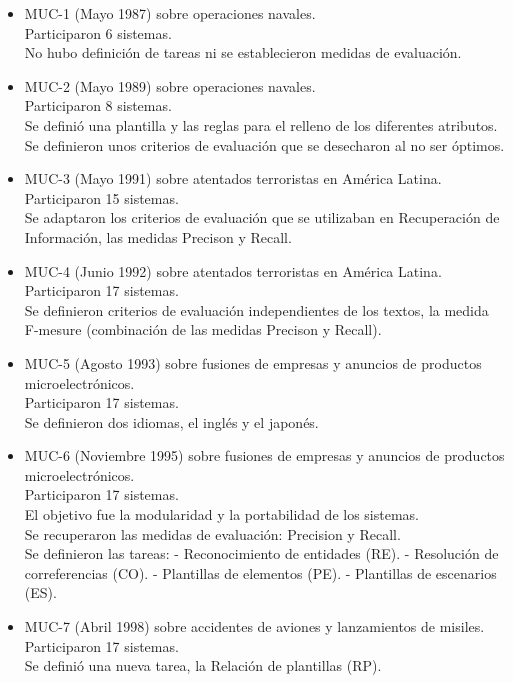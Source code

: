 \documentclass[11pt]{exam}
\begin{document}
\begin{questions}
\begin{itemize}
	\item MUC-1 (Mayo 1987) sobre operaciones navales. \\
	Participaron 6 sistemas. \\
	No hubo definición de tareas ni se establecieron medidas de evaluación.
	\item MUC-2 (Mayo 1989) sobre operaciones navales. \\
	Participaron 8 sistemas. \\
	Se definió una plantilla y las reglas para el relleno de los diferentes atributos. \\
	Se definieron unos criterios de evaluación que se desecharon al no ser óptimos.
	\item MUC-3 (Mayo 1991) sobre atentados terroristas en América Latina. \\
	Participaron 15 sistemas. \\
	Se adaptaron los criterios de evaluación que se utilizaban en Recuperación de Información, las medidas Precison y Recall.
	\item MUC-4 (Junio 1992) sobre atentados terroristas en América Latina. \\
	Participaron 17 sistemas. \\
	Se definieron criterios de evaluación independientes de los textos, la medida F-mesure (combinación de las medidas Precison y Recall).
	\item MUC-5 (Agosto 1993) sobre fusiones de empresas y anuncios de productos microelectrónicos. \\
	Participaron 17 sistemas. \\
	Se definieron dos idiomas, el inglés y el japonés.
	\item MUC-6 (Noviembre 1995) sobre fusiones de empresas y anuncios de productos microelectrónicos. \\
	Participaron 17 sistemas. \\
	El objetivo fue la modularidad y la portabilidad de los sistemas. \\
	Se recuperaron las medidas de evaluación: Precision y Recall. \\
	Se definieron las tareas:
	\subitem - Reconocimiento de entidades (RE).
	\subitem - Resolución de correferencias (CO).
	\subitem - Plantillas de elementos (PE).
	\subitem - Plantillas de escenarios (ES).
	\item MUC-7 (Abril 1998) sobre accidentes de aviones y lanzamientos de misiles. \\
	Participaron 17 sistemas. \\
	Se definió una nueva tarea, la Relación de plantillas (RP).
\end{itemize}
	
\end{questions}
	
\end{document}
